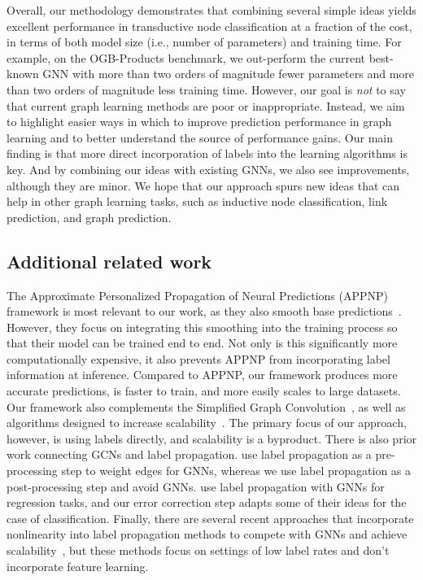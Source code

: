 \documentclass{article}
\begin{document}
Overall, our methodology demonstrates that combining several simple ideas yields excellent performance in
transductive node classification at a fraction of the cost, in terms of both model size (i.e., number of parameters) and training time.
For example, on the OGB-Products benchmark, we out-perform the current best-known GNN with 
more than two orders of magnitude fewer parameters and more than two orders of magnitude less training time.
However, our goal is \emph{not} to say that current graph learning methods are poor or inappropriate.
Instead, we aim to highlight easier ways in which to improve prediction performance in graph learning
and to better understand the source of performance gains.
Our main finding is that more direct incorporation of labels into the learning algorithms is key.
And by combining our ideas with existing GNNs, we also see improvements, although they are minor.
We hope that our approach spurs new ideas that can help in other graph learning tasks, 
such as inductive node classification, link prediction, and graph prediction.



\subsection{Additional related work}

The Approximate Personalized Propagation of Neural Predictions (APPNP) framework is most
relevant to our work, as they also smooth base predictions~\citep{klicpera2018predict}.
However, they focus on integrating this smoothing into the training process so that their model can be trained end to end. 
Not only is this significantly more computationally expensive, it also prevents APPNP from incorporating label information at inference. 
Compared to APPNP, our framework produces more accurate predictions, is faster to train, and more easily scales to large datasets.
Our framework also complements the Simplified Graph Convolution~\citep{pmlr-v97-wu19e}, as well as
algorithms designed to increase scalability~\citep{bojchevski2020scaling,zeng2019graphsaint,rossi2020sign}.
The primary focus of our approach, however, is using labels directly, and scalability is a byproduct.
There is also prior work connecting GCNs and label propagation.
 use label propagation as a pre-processing step to weight edges for GNNs,
whereas we use label propagation as a post-processing step and avoid GNNs.
 use label propagation with GNNs for regression tasks, and our error
correction step adapts some of their ideas for the case of classification.
Finally, there are several recent approaches that incorporate nonlinearity into label
propagation methods to compete with GNNs and achieve
scalability~\citep{eliav2018bootstrapped,ibrahim2019nonlinear,tudisco2020nonlinear},
but these methods focus on settings of low label rates and don't incorporate feature learning.
\end{document}
